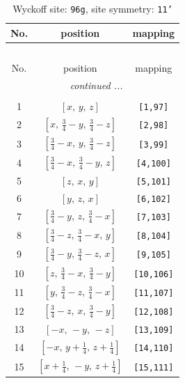 \documentclass[fleqn,8pt]{jsarticle}
\begin{document}
\begin{longtable}{ccc}
\caption{Wyckoff site: {\tt 96g}, site symmetry: {\tt 11'}}
 \\
 \hline \hline
No. & position & mapping \\ \hline \endfirsthead

\multicolumn{2}{l}{\tablename\ \thetable{}} \\
 \hline \hline
No. & position & mapping \\ \hline \endhead

 \hline \hline
\multicolumn{2}{r}{\footnotesize\it continued ...} \\ \endfoot

 \hline \hline
\multicolumn{2}{r}{} \\ \endlastfoot

1 & $\left[ x,\, y,\, z \right]$ & {\tt [1,97]} \\ \hline
2 & $\left[ x,\, \frac{3}{4} - y,\, \frac{3}{4} - z \right]$ & {\tt [2,98]} \\ \hline
3 & $\left[ \frac{3}{4} - x,\, y,\, \frac{3}{4} - z \right]$ & {\tt [3,99]} \\ \hline
4 & $\left[ \frac{3}{4} - x,\, \frac{3}{4} - y,\, z \right]$ & {\tt [4,100]} \\ \hline
5 & $\left[ z,\, x,\, y \right]$ & {\tt [5,101]} \\ \hline
6 & $\left[ y,\, z,\, x \right]$ & {\tt [6,102]} \\ \hline
7 & $\left[ \frac{3}{4} - y,\, z,\, \frac{3}{4} - x \right]$ & {\tt [7,103]} \\ \hline
8 & $\left[ \frac{3}{4} - z,\, \frac{3}{4} - x,\, y \right]$ & {\tt [8,104]} \\ \hline
9 & $\left[ \frac{3}{4} - y,\, \frac{3}{4} - z,\, x \right]$ & {\tt [9,105]} \\ \hline
10 & $\left[ z,\, \frac{3}{4} - x,\, \frac{3}{4} - y \right]$ & {\tt [10,106]} \\ \hline
11 & $\left[ y,\, \frac{3}{4} - z,\, \frac{3}{4} - x \right]$ & {\tt [11,107]} \\ \hline
12 & $\left[ \frac{3}{4} - z,\, x,\, \frac{3}{4} - y \right]$ & {\tt [12,108]} \\ \hline
13 & $\left[ - x,\, - y,\, - z \right]$ & {\tt [13,109]} \\ \hline
14 & $\left[ - x,\, y + \frac{1}{4},\, z + \frac{1}{4} \right]$ & {\tt [14,110]} \\ \hline
15 & $\left[ x + \frac{1}{4},\, - y,\, z + \frac{1}{4} \right]$ & {\tt [15,111]} \\ \hline

\end{longtable}
\end{document}
